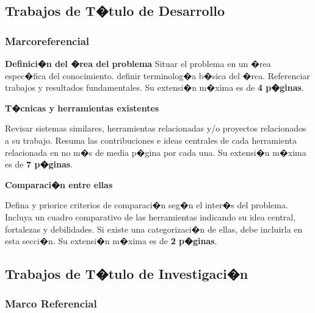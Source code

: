 \documentclass[12pt,a4paper]{article}
\begin{document}
\newpage
\subsection{Trabajos de T�tulo de Desarrollo}

\subsubsection{Marcoreferencial}

\large{\textbf{Definici�n del �rea del problema}} \label{contexto}
\vspace{2mm}
\normalsize
Situar el problema en un �rea espec�fica del conocimiento. definir
terminolog�a b�sica del �rea. Referenciar trabajos y resultados
fundamentales. Su extensi�n m�xima es de \textbf{4 p�ginas}.

\vspace{2mm}

\large{\textbf{\textbf{T�cnicas y herramientas existentes}}}
\label{tec}

\vspace{1mm}

\normalsize

Revisar sistemas similares, herramientas relacionadas y/o proyectos
relacionados a su trabajo. Resuma las contribuciones e ideas
centrales de cada herramienta relacionada en no m�s de media p�gina
por cada una. Su extensi�n m�xima es de \textbf{7 p�ginas}.

\vspace{2mm}

\large{\textbf{Comparaci�n entre ellas}} \label{comp}

\vspace{1mm}

\normalsize

Defina y priorice criterios de comparaci�n seg�n el inter�s del
problema. Incluya un cuadro comparativo de las herramientas indicando
su idea central, fortalezas y debilidades. Si existe una
categorizaci�n de ellas, debe incluirla en esta secci�n. Su
extensi�n m�xima es de \textbf{2 p�ginas}.

\vspace{3mm}
\subsection{Trabajos de T�tulo de Investigaci�n}


\subsubsection{Marco Referencial}
\label{marco}
\end{document}
